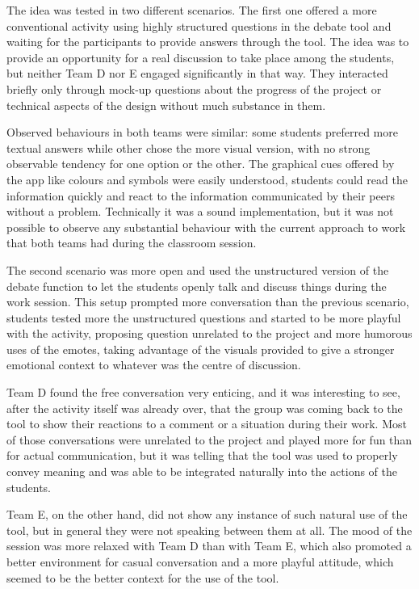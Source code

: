 The idea was tested in two different scenarios. The first one offered a more conventional activity using highly structured questions in the debate tool and waiting for
the participants to provide answers through the tool. The idea was to provide an opportunity for a real discussion to take place among the students, but neither Team D
nor E engaged significantly in that way. They interacted briefly only through mock-up questions about the progress of the project or technical aspects of the design
without much substance in them.

Observed behaviours in both teams were similar: some students preferred more textual answers while other chose the more visual version, with no strong observable tendency
for one option or the other. The graphical cues offered by the app like colours and symbols were easily understood, students could read the information quickly and react
to the information communicated by their peers without a problem. Technically it was a sound implementation, but it was not possible to observe any substantial behaviour
with the current approach to work that both teams had during the classroom session.

The second scenario was more open and used the unstructured version of the debate function to let the students openly talk and discuss things during the work session. This
setup prompted more conversation than the previous scenario, students tested more the unstructured questions and started to be more playful with the activity, proposing
question unrelated to the project and more humorous uses of the emotes, taking advantage of the visuals provided to give a stronger emotional context to whatever was the
centre of discussion.

Team D found the free conversation very enticing, and it was interesting to see, after the activity itself was already over, that the group was coming back to the tool to
show their reactions to a comment or a situation during their work. Most of those conversations were unrelated to the project and played more for fun than for actual
communication, but it was telling that the tool was used to properly convey meaning and was able to be integrated naturally into the actions of the students.

Team E, on the other hand, did not show any instance of such natural use of the tool, but in general they were not speaking between them at all. The mood of the session
was more relaxed with Team D than with Team E, which also promoted a better environment for casual conversation and a more playful attitude, which seemed to be the better
context for the use of the tool.

